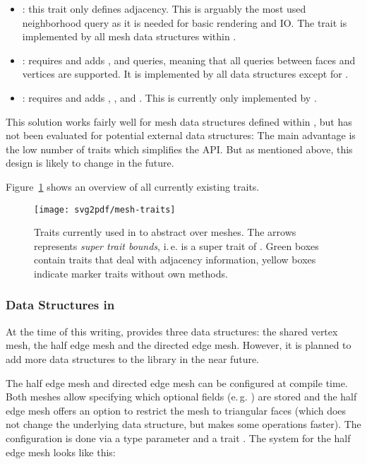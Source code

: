 \begin{itemize}
  \item \textbf{}: this trait only defines  adjacency.
  This is arguably the most used neighborhood query as it is needed for basic rendering and IO.
  The trait is implemented by all mesh data structures within .
  \item \textbf{}: requires  and adds ,  and  queries, meaning that all queries between faces and vertices are supported.
  It is implemented by all data structures except for .
  \item \textbf{}: requires  and adds , ,  and .
  This is currently only implemented by .
\end{itemize}

This solution works fairly well for mesh data structures defined within , but has not been evaluated for potential external data structures:
The main advantage is the low number of traits which simplifies the API.
But as mentioned above, this design is likely to change in the future.

Figure~\ref{fig:mesh-traits} shows an overview of all currently existing traits.

\begin{figure}[th]
  \centering
  \texttt{[image: svg2pdf/mesh-traits]}
  \caption{
    Traits currently used in  to abstract over meshes.
    The arrows represents \emph{super trait bounds}, i.\,e.  is a super trait of .
    Green boxes contain traits that deal with adjacency information, yellow boxes indicate marker traits without own methods.
  }
  \label{fig:mesh-traits}
\end{figure}


\subsubsection*{Data Structures in }

At the time of this writing,  provides three data structures:
the shared vertex mesh, the half edge mesh and the directed edge mesh.
However, it is planned to add more data structures to the library in the near future.

The half edge mesh and directed edge mesh can be configured at compile time.
Both meshes allow specifying which optional fields (e.\,g. ) are stored and the half edge mesh offers an option to restrict the mesh to triangular faces (which does not change the underlying data structure, but makes some operations faster).
The configuration is done via a type parameter and a trait .
The system for the half edge mesh looks like this:

